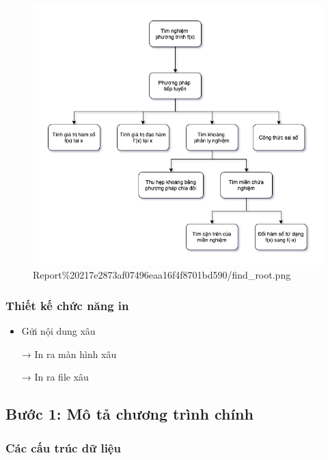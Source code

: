 \begin{figure}[htbp]
\centering
\includegraphics{Report 217e2873af07496eaa16f4f8701bd590/find_root.png}
\caption{Report\%20217e2873af07496eaa16f4f8701bd590/find\_root.png}
\end{figure}

\subsubsection{Thiết kế chức năng
in}\label{thiux1ebft-kux1ebf-chux1ee9c-nux103ng-in}

\begin{itemize}
\item
  Gửi nội dung xâu

  → In ra màn hình xâu

  → In ra file xâu
\end{itemize}

\subsection{Bước 1: Mô tả chương trình
chính}\label{bux1b0ux1edbc-1-muxf4-tux1ea3-chux1b0ux1a1ng-truxecnh-chuxednh}

\subsubsection{Các cấu trúc dữ
liệu}\label{cuxe1c-cux1ea5u-truxfac-dux1eef-liux1ec7u}


